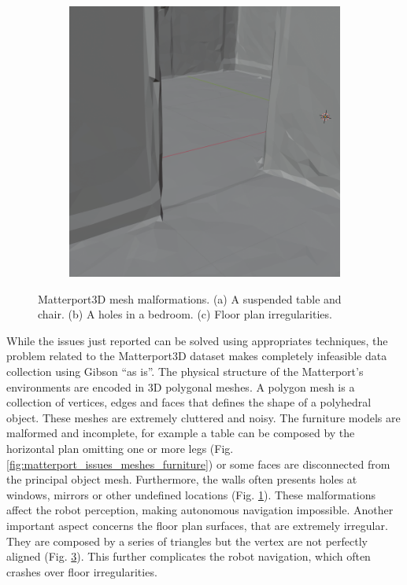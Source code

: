 \begin{figure}[h!]
\begin{subfigure}[b]{0.32\linewidth}
		\caption{}
		\label{fig:matterport_issues_hole}
	\end{subfigure}
	\hfil
	\begin{subfigure}[b]{0.32\linewidth}
		\centering
		\includegraphics[width=\textwidth]{images/floor_plan_irregularity.png}
		\caption{}
		\label{fig:matterport_issues_floor_plan}
	\end{subfigure}
	\caption{Matterport3D mesh malformations. (a) A suspended table and chair. (b) A holes in a bedroom. (c) Floor plan irregularities.}
\end{figure}

While the issues just reported can be solved using appropriates techniques, the problem related to the Matterport3D dataset makes completely infeasible data collection using Gibson ``as is''. The physical structure of the Matterport's environments are encoded in 3D polygonal meshes. A polygon mesh is a collection of vertices, edges and faces that defines the shape of a polyhedral object. These meshes are extremely cluttered and noisy. The furniture models are malformed and incomplete, for example a table can be composed by the horizontal plan omitting one or more legs (Fig. \ref{fig:matterport_issues_meshes_furniture}) or some faces are disconnected from the principal object mesh. Furthermore, the walls often presents holes at windows, mirrors or other undefined locations (Fig. \ref{fig:matterport_issues_hole}). These malformations affect the robot perception, making autonomous navigation impossible. Another important aspect concerns the floor plan surfaces, that are extremely irregular. They are composed by a series of triangles but the vertex are not perfectly aligned (Fig. \ref{fig:matterport_issues_floor_plan}). This further complicates the robot navigation, which often crashes over floor irregularities.

